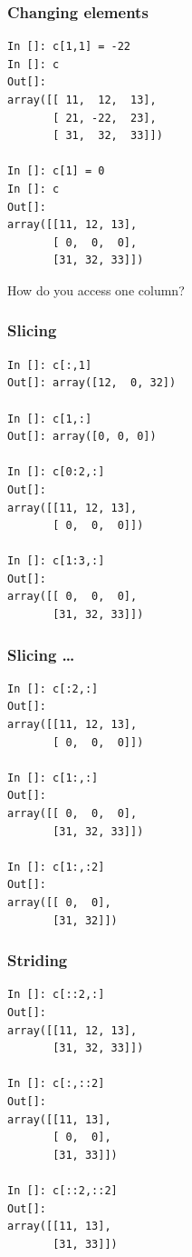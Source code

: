 \documentclass[14pt,compress]{beamer}
\begin{document}
\begin{frame}[fragile]
  \frametitle{Changing elements}
  \begin{small}
  \begin{lstlisting}
In []: c[1,1] = -22
In []: c
Out[]:
array([[ 11,  12,  13],
       [ 21, -22,  23],
       [ 31,  32,  33]])

In []: c[1] = 0
In []: c
Out[]:
array([[11, 12, 13],
       [ 0,  0,  0],
       [31, 32, 33]])
  \end{lstlisting}
  \end{small}
How do you access one \alert{column}?
\end{frame}

\begin{frame}[fragile]
  \frametitle{Slicing}
\begin{small}
  \begin{lstlisting}
In []: c[:,1]
Out[]: array([12,  0, 32])

In []: c[1,:]
Out[]: array([0, 0, 0])

In []: c[0:2,:]
Out[]:
array([[11, 12, 13],
       [ 0,  0,  0]])

In []: c[1:3,:]
Out[]:
array([[ 0,  0,  0],
       [31, 32, 33]])
  \end{lstlisting}
\end{small}
\end{frame}

\begin{frame}[fragile]
  \frametitle{Slicing \ldots}
\begin{small}
  \begin{lstlisting}
In []: c[:2,:]
Out[]:
array([[11, 12, 13],
       [ 0,  0,  0]])

In []: c[1:,:]
Out[]:
array([[ 0,  0,  0],
       [31, 32, 33]])

In []: c[1:,:2]
Out[]:
array([[ 0,  0],
       [31, 32]])
  \end{lstlisting}

\end{small}
\end{frame}

\begin{frame}[fragile]
  \frametitle{Striding}
  \begin{small}
  \begin{lstlisting}
In []: c[::2,:]
Out[]:
array([[11, 12, 13],
       [31, 32, 33]])

In []: c[:,::2]
Out[]:
array([[11, 13],
       [ 0,  0],
       [31, 33]])

In []: c[::2,::2]
Out[]:
array([[11, 13],
       [31, 33]])
  \end{lstlisting}
  \end{small}
\end{frame}
\end{document}
